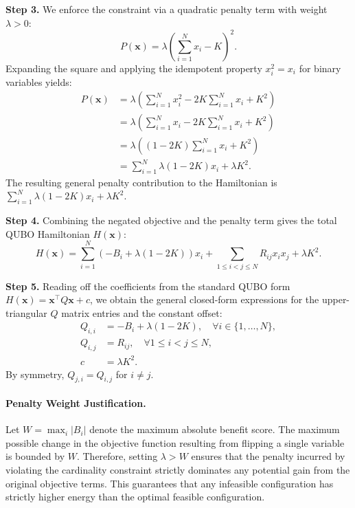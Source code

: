 \documentclass[12pt]{article}
\begin{document}
\textbf{Step 3.} We enforce the constraint via a quadratic penalty term with weight $\lambda > 0$:
\begin{equation}
  P(\mathbf{x}) = \lambda \left( \sum_{i=1}^N x_i - K \right)^2.
\end{equation}
Expanding the square and applying the idempotent property $x_i^2 = x_i$ for binary variables yields:
\begin{align}
  P(\mathbf{x}) &= \lambda \left( \sum_{i=1}^N x_i^2 - 2K \sum_{i=1}^N x_i + K^2 \right) \\
  &= \lambda \left( \sum_{i=1}^N x_i - 2K \sum_{i=1}^N x_i + K^2 \right) \\
  &= \lambda \left( (1 - 2K) \sum_{i=1}^N x_i + K^2 \right) \\
  &= \sum_{i=1}^N \lambda(1 - 2K) x_i + \lambda K^2.
\end{align}
The resulting general penalty contribution to the Hamiltonian is $\sum_{i=1}^N \lambda(1 - 2K) x_i + \lambda K^2$.

\textbf{Step 4.} Combining the negated objective and the penalty term gives the total QUBO Hamiltonian $H(\mathbf{x})$:
\begin{equation}
  H(\mathbf{x}) = \sum_{i=1}^N \left( -B_i + \lambda(1 - 2K) \right) x_i + \sum_{1 \le i < j \le N} R_{ij} x_i x_j + \lambda K^2.
\end{equation}

\textbf{Step 5.} Reading off the coefficients from the standard QUBO form $H(\mathbf{x}) = \mathbf{x}^\top Q \mathbf{x} + c$, we obtain the general closed-form expressions for the upper-triangular $Q$ matrix entries and the constant offset:
\begin{align}
  Q_{i,i} &= -B_i + \lambda(1 - 2K), \quad \forall i \in \{1, \dots, N\}, \\
  Q_{i,j} &= R_{ij}, \quad \forall 1 \le i < j \le N, \\
  c &= \lambda K^2.
\end{align}
By symmetry, $Q_{j,i} = Q_{i,j}$ for $i \neq j$.

\paragraph{Penalty Weight Justification.}
Let $W = \max_{i} |B_i|$ denote the maximum absolute benefit score. The maximum possible change in the objective function resulting from flipping a single variable is bounded by $W$. Therefore, setting $\lambda > W$ ensures that the penalty incurred by violating the cardinality constraint strictly dominates any potential gain from the original objective terms. This guarantees that any infeasible configuration has strictly higher energy than the optimal feasible configuration.
\end{document}
